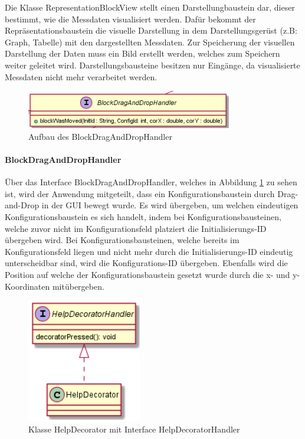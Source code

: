 \documentclass[parskip=full]{scrartcl}
\begin{document}
Die Klasse RepresentationBlockView stellt einen Darstellungbaustein dar, dieser bestimmt, wie die Messdaten visualisiert werden. Dafür bekommt der Repräsentationsbaustein die visuelle Darstellung in dem Darstellungsgerüst (z.B: Graph, Tabelle) mit den dargestellten Messdaten.
Zur Speicherung der visuellen Darstellung der Daten muss ein Bild erstellt werden, welches zum Speichern weiter geleitet wird.
Darstellungsbausteine besitzen nur Eingänge, da visualisierte Messdaten nicht mehr verarbeitet werden. 

\clearpage

\begin{figure}[htbp]
	\begin{center}
		\includegraphics[width = 9cm]{Grafiken/View/BlockDragAndDropHandler.png}
		\caption{Aufbau des BlockDragAndDropHandler}
		\label{BlockDragAndDropHandler}
	\end{center}
\end{figure}

\paragraph{BlockDragAndDropHandler}

Über das Interface BlockDragAndDropHandler, welches in Abbildung \ref{BlockDragAndDropHandler} zu sehen ist, wird der Anwendung mitgeteilt, dass ein Konfigurationsbaustein durch Drag-and-Drop in der GUI bewegt wurde. Es wird übergeben, um welchen eindeutigen Konfigurationsbaustein es sich handelt, indem bei Konfigurationsbausteinen, welche zuvor nicht im Konfigurationsfeld platziert die Initialisierungs-ID übergeben wird. Bei Konfigurationsbausteinen, welche bereits im Konfigurationsfeld liegen und nicht mehr durch die Initialisierungs-ID eindeutig unterscheidbar sind, wird die Konfigurations-ID übergeben. Ebenfalls wird die Position auf welche der Konfigurationsbaustein gesetzt wurde durch die x- und y- Koordinaten mitübergeben.

\begin{figure}[htbp]
	\begin{center}
		\includegraphics[width = 5cm]{Grafiken/View/HelpDecorator.png}
		\caption{Klasse HelpDecorator mit Interface HelpDecoratorHandler}
		\label{Help}
	\end{center}
\end{figure}
\end{document}

